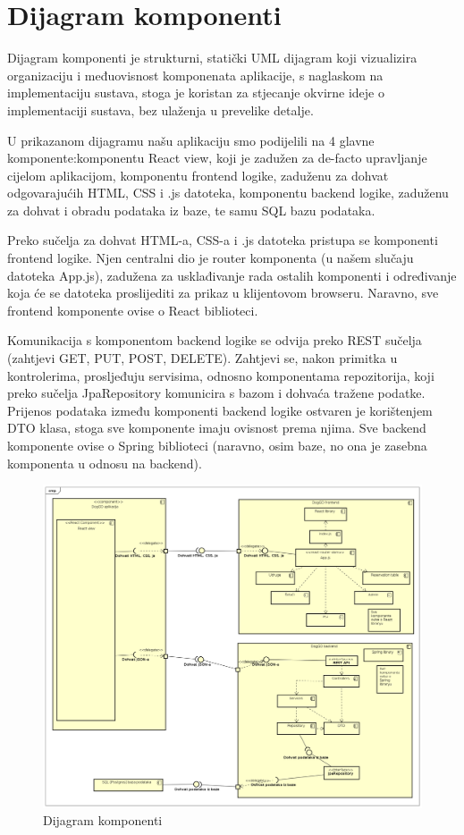 			\eject
		\section{Dijagram komponenti}
		Dijagram komponenti je strukturni, statički UML dijagram koji vizualizira organizaciju i međuovisnost komponenata aplikacije, s naglaskom na implementaciju sustava, stoga je koristan za stjecanje okvirne ideje o implementaciji sustava, bez ulaženja u prevelike detalje.
		 
		U prikazanom dijagramu našu aplikaciju smo podijelili na 4 glavne komponente:komponentu React view, koji je zadužen za de-facto upravljanje cijelom aplikacijom, komponentu frontend logike, zaduženu za dohvat odgovarajućih HTML, CSS i .js datoteka, komponentu backend logike, zaduženu za dohvat i obradu podataka iz baze, te samu SQL bazu podataka.
		
		Preko sučelja za dohvat HTML-a, CSS-a i .js datoteka pristupa se komponenti frontend logike. Njen centralni dio je router komponenta (u našem slučaju datoteka App.js), zadužena za usklađivanje rada ostalih komponenti i određivanje koja će se datoteka proslijediti za prikaz u klijentovom browseru. Naravno, sve frontend komponente ovise o React biblioteci.
		
		Komunikacija s komponentom backend logike se odvija preko REST sučelja (zahtjevi GET, PUT, POST, DELETE). Zahtjevi se, nakon primitka u kontrolerima, prosljeđuju servisima, odnosno komponentama repozitorija, koji preko sučelja JpaRepository komunicira s bazom i dohvaća tražene podatke. Prijenos podataka između komponenti backend logike ostvaren je korištenjem DTO klasa, stoga sve komponente imaju ovisnost prema njima. Sve backend komponente ovise o Spring biblioteci (naravno, osim baze, no ona je zasebna komponenta u odnosu na backend).
		
		\begin{figure}[H]
			\includegraphics[scale=0.3]{dijagrami/component_diagram.png}
			\centering
			\caption{Dijagram komponenti}
			\label{fig:domain}
		\end{figure}
		
